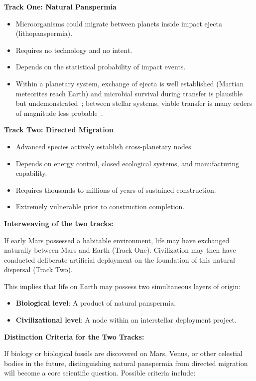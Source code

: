 \documentclass[aps,prd,twocolumn,superscriptaddress,nofootinbib]{revtex4-2}
\begin{document}
\textbf{Track One: Natural Panspermia}
\begin{itemize}
  \item Microorganisms could migrate between planets inside impact ejecta (lithopanspermia).
  \item Requires no technology and no intent.
  \item Depends on the statistical probability of impact events.
  \item Within a planetary system, exchange of ejecta is well established (Martian meteorites reach Earth) and microbial survival during transfer is plausible but undemonstrated~\cite{Worth2013}; between stellar systems, viable transfer is many orders of magnitude less probable~\cite{Melosh2003}.
\end{itemize}

\textbf{Track Two: Directed Migration}
\begin{itemize}
  \item Advanced species actively establish cross-planetary nodes.
  \item Depends on energy control, closed ecological systems, and manufacturing capability.
  \item Requires thousands to millions of years of sustained construction.
  \item Extremely vulnerable prior to construction completion.
\end{itemize}

\textbf{Interweaving of the two tracks:}

If early Mars possessed a habitable environment, life may have exchanged naturally between Mars and Earth (Track One). Civilization may then have conducted deliberate artificial deployment on the foundation of this natural dispersal (Track Two).

This implies that life on Earth may possess two simultaneous layers of origin:
\begin{itemize}
  \item \textbf{Biological level}: A product of natural panspermia.
  \item \textbf{Civilizational level}: A node within an interstellar deployment project.
\end{itemize}

\textbf{Distinction Criteria for the Two Tracks:}

If biology or biological fossils are discovered on Mars, Venus, or other celestial bodies in the future, distinguishing natural panspermia from directed migration will become a core scientific question. Possible criteria include:
\end{document}
